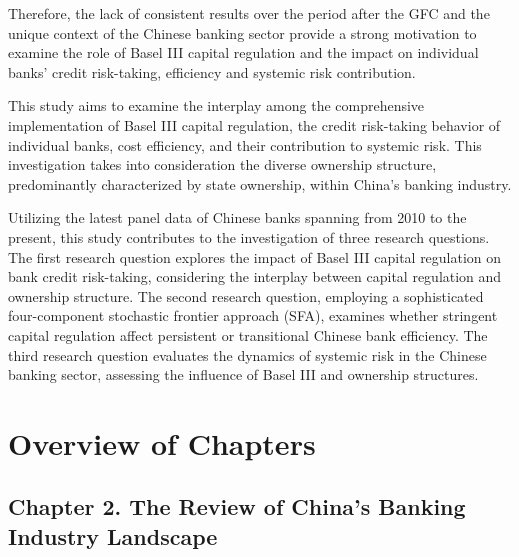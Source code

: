 \documentclass[
  12pt,
  a4paper,
  DIV=11,
  numbers=noendperiod]{scrreprt}
\begin{document}
Therefore, the lack of consistent results over the period after the GFC
and the unique context of the Chinese banking sector provide a strong
motivation to examine the role of Basel III capital regulation and the
impact on individual banks' credit risk-taking, efficiency and systemic
risk contribution.

This study aims to examine the interplay among the comprehensive
implementation of Basel III capital regulation, the credit risk-taking
behavior of individual banks, cost efficiency, and their contribution to
systemic risk. This investigation takes into consideration the diverse
ownership structure, predominantly characterized by state ownership,
within China's banking industry.

Utilizing the latest panel data of Chinese banks spanning from 2010 to
the present, this study contributes to the investigation of three
research questions. The first research question explores the impact of
Basel III capital regulation on bank credit risk-taking, considering the
interplay between capital regulation and ownership structure. The second
research question, employing a sophisticated four-component stochastic
frontier approach (SFA), examines whether stringent capital regulation
affect persistent or transitional Chinese bank efficiency. The third
research question evaluates the dynamics of systemic risk in the Chinese
banking sector, assessing the influence of Basel III and ownership
structures.

\section{Overview of Chapters}\label{overview-of-chapters}

\subsection{Chapter 2. The Review of China's Banking Industry
Landscape}\label{chapter-2.-the-review-of-chinas-banking-industry-landscape}
\end{document}
